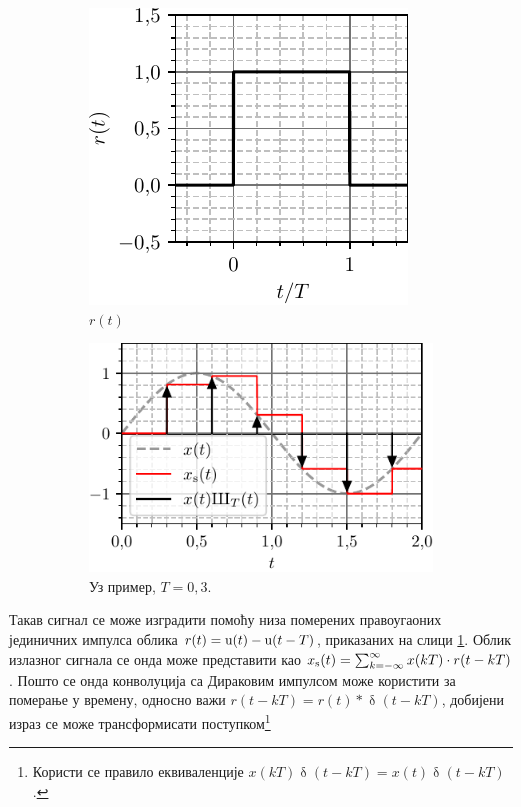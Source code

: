 \begin{figure}[hb!]
    \begin{subfigure}[t]{0.35\textwidth}
        \centering
        \includegraphics[scale=1]{fig/SH_plot_2.pdf}
        \caption{$r(t)$}        
        \label{fig:\ID.pulse}
    \end{subfigure}
    \hfill
    \begin{subfigure}[t]{0.55\textwidth}
        \centering
        \includegraphics[scale=1]{fig/SH_plot_1.pdf}
        \caption{Уз пример, $T = 0,3$.}        
        \label{fig:\ID.primer}
    \end{subfigure}
    \caption{}
\end{figure}

Такав сигнал се може изградити помоћу низа померених правоугаоних јединичних импулса 
облика ${r(t) = {\rm u}(t) - {\rm u}(t - T)}$,
приказаних на слици \ref{fig:\ID.pulse}. Облик излазног сигнала се онда може представити као 
$x_{\rm s}(t) = \sum_{k = -\infty}^{\infty} x(kT) \cdot r(t - kT)$. Пошто се онда
конволуција са Дираковим импулсом може користити за померање у времену, односно важи
$r(t - kT) = r(t) \ast \updelta(t - kT)$, добијени израз се може трансформисати 
поступком\footnote{Користи се правило еквиваленције 
$x(kT) \updelta(t - kT) = x(t) \updelta(t - kT)$. }
  
